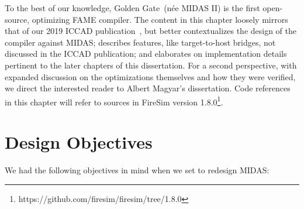 To the best of our knowledge, Golden Gate~(n\'{e}e MIDAS II) is the first
open-source, optimizing FAME compiler. The content in this chapter loosely
mirrors that of our 2019 ICCAD publication~\cite{GoldenGate}, but better
contextualizes the design of the compiler against MIDAS; describes features,
like target-to-host bridges, not discussed in the ICCAD publication; and
elaborates on implementation details pertinent to the later chapters of this
dissertation.  For a second perspective, with expanded discussion on the
optimizations themselves and how they were verified, we direct the interested
reader to Albert Magyar's dissertation. Code references in this chapter will
refer to sources in FireSim version
1.8.0\footnote{https://github.com/firesim/firesim/tree/1.8.0}.

\section{Design Objectives}\label{sec:gg-design-objectives}

We had the following objectives in mind when we set to redesign MIDAS:

